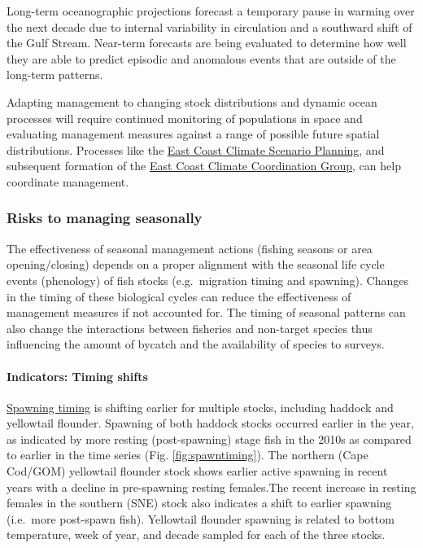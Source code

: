 \documentclass[
  10pt,
]{article}
\begin{document}
Long-term oceanographic projections forecast a temporary pause in warming over the next decade due to internal variability in circulation and a southward shift of the Gulf Stream. Near-term forecasts are being evaluated to determine how well they are able to predict episodic and anomalous events that are outside of the long-term patterns.

Adapting management to changing stock distributions and dynamic ocean processes will require continued monitoring of populations in space and evaluating management measures against a range of possible future spatial distributions. Processes like the \href{https://www.mafmc.org/climate-change-scenario-planning}{East Coast Climate Scenario Planning}, and subsequent formation of the \href{https://www.mafmc.org/e3cg}{East Coast Climate Coordination Group}, can help coordinate management.

\subsubsection{Risks to managing seasonally}\label{risks-to-managing-seasonally}

The effectiveness of seasonal management actions (fishing seasons or area opening/closing) depends on a proper alignment with the seasonal life cycle events (phenology) of fish stocks (e.g.~migration timing and spawning). Changes in the timing of these biological cycles can reduce the effectiveness of management measures if not accounted for. The timing of seasonal patterns can also change the interactions between fisheries and non-target species thus influencing the amount of bycatch and the availability of species to surveys.

\paragraph{Indicators: Timing shifts}\label{indicators-timing-shifts}

\href{https://noaa-edab.github.io/catalog/spawn_timing.html}{Spawning timing} is shifting earlier for multiple stocks, including haddock and yellowtail flounder. Spawning of both haddock stocks occurred earlier in the year, as indicated by more resting (post-spawning) stage fish in the 2010s as compared to earlier in the time series (Fig. \ref{fig:spawntiming}). The northern (Cape Cod/GOM) yellowtail flounder stock shows earlier active spawning in recent years with a decline in pre-spawning resting females.The recent increase in resting females in the southern (SNE) stock also indicates a shift to earlier spawning (i.e.~more post-spawn fish). Yellowtail flounder spawning is related to bottom temperature, week of year, and decade sampled for each of the three stocks.
\end{document}
